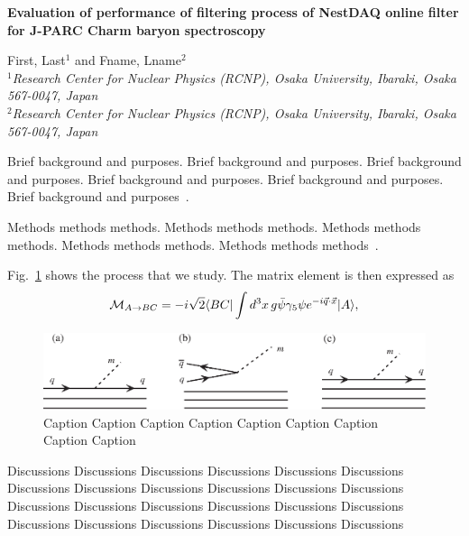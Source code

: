 \documentclass{snpyrs}
\newcommand{\be}{\begin{eqnarray}}
\newcommand{\ee}{\end{eqnarray}}
\newcommand{\ket}{\rangle}
\newcommand{\bra}{\langle}
\begin{document}
%
\begin{center}
{\large \bf Evaluation of performance of filtering process of NestDAQ online filter for J-PARC Charm baryon spectroscopy}
\vspace*{0.3cm}

First, Last$^{1}$ and Fname, Lname$^{2}$\\
$^{1}${\it Research Center for Nuclear Physics (RCNP), Osaka University,
Ibaraki, Osaka 567-0047, Japan}\\
$^{2}${\it Research Center for Nuclear Physics (RCNP), Osaka University,
Ibaraki, Osaka 567-0047, Japan}\\
\end{center}

\vspace*{0.5cm}
%
%
Brief background and purposes. 
Brief background and purposes.  
Brief background and purposes.  
Brief background and purposes.  
Brief background and purposes.  
Brief background and purposes~\cite{Brambilla:2022ura}.


Methods methods methods. 
Methods methods methods.  
Methods methods methods.  
Methods methods methods.  
Methods methods methods~\cite{Aoki:2021cqa}.



Fig.~\ref{fallapart} shows the process that we study. 
The matrix element is then expressed as 
\be
{\cal M}_{A \to BC} =
-i \sqrt{2} 
\bra BC |  
 \int d^3 x \, g \bar \psi \gamma_5 \psi
e^{-i \vec q \cdot \vec x} 
|A\ket ,
\label{calM1}
\ee

\begin{figure}[h]
\centering
\includegraphics[width=14cm,clip]{fig_decay.eps}
\caption{
Caption Caption Caption Caption Caption Caption Caption Caption Caption  }
\label{fallapart}
\end{figure}


Discussions Discussions Discussions Discussions Discussions Discussions Discussions Discussions 
Discussions Discussions Discussions Discussions Discussions Discussions Discussions Discussions 
Discussions Discussions Discussions Discussions Discussions Discussions Discussions Discussions 
\end{document}
